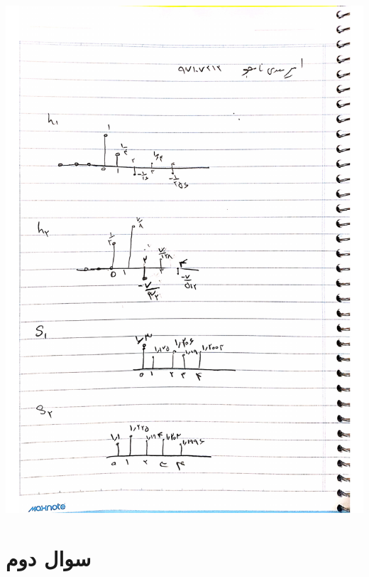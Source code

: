 \documentclass[12pt]{article}
\begin{document}
\begin{enumerate}
\includegraphics[width = 1.0\textwidth]{images/1.pdf}
\end{enumerate}

\newpage

\section{سوال دوم}
\end{document}
